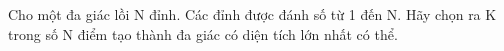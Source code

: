 Cho một đa giác lồi N đỉnh. Các đỉnh được đánh số từ 1 đến N. Hãy chọn ra K trong số N điểm tạo thành đa giác có diện tích lớn nhất có thể.
